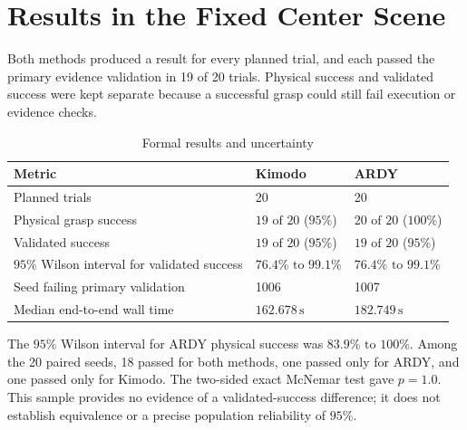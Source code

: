 \documentclass[11pt,a4paper]{article}
\begin{document}
\section*{Results in the Fixed Center Scene}

Both methods produced a result for every planned trial, and each passed the primary evidence validation in 19 of 20 trials. Physical success and validated success were kept separate because a successful grasp could still fail execution or evidence checks.

\begin{table}[H]
\centering
\caption{Formal results and uncertainty}
\label{tab:comparison-3}
\small
\begin{tabularx}{\linewidth}{|Y|C{\tabcolsep\relax}|C{\tabcolsep\relax}|}
\hline
{}
\textbf{Metric} & \textbf{Kimodo} & \textbf{ARDY} \\ \hline
Planned trials & 20 & 20 \\ \hline
Physical grasp success & \(19  \text{ of } 20\)  (\(95\%\)) & \(20 \text{ of } 20\)  (\(100\%\)) \\ \hline
Validated success & \(19  \text{ of } 20\)  (\(95\%\)) & \(19  \text{ of } 20\)  (\(95\%\)) \\ \hline
\(95\%\) Wilson interval for validated success & \(76.4\%\text{ to }99.1\%\) & \(76.4\%\text{ to }99.1\%\) \\ \hline
Seed failing primary validation & 1006 & 1007 \\ \hline
Median end-to-end wall time & \(162.678\,\mathrm{s}\) & \(182.749\,\mathrm{s}\) \\ \hline
\end{tabularx}
\end{table}

The \(95\%\) Wilson interval for ARDY physical success was \(83.9\%\text{ to }100\%\). Among the 20 paired seeds, 18 passed for both methods, one passed only for ARDY, and one passed only for Kimodo. The two-sided exact McNemar test gave \(p = 1.0\). This sample provides no evidence of a validated-success difference; it does not establish equivalence or a precise population reliability of \(95\%\).
\end{document}
